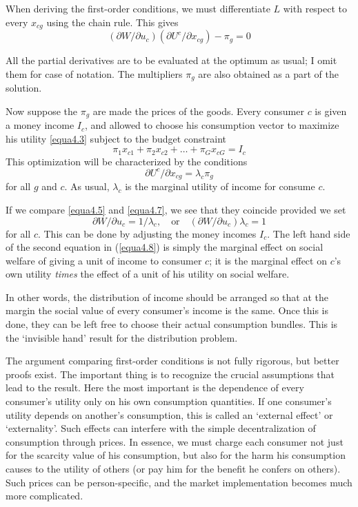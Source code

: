 When deriving the first-order conditions, we must differentiate $L$ with respect to every $x_{cg}$ using the chain rule. This gives
\begin{equation} \label{equa4.5}
 (\partial W / \partial u_c)  (\partial U^c / \partial x_{cg}) - \pi_g =0
\end{equation}

All the partial derivatives are to be evaluated at the optimum as usual; I omit them for case of notation. The multipliers $\pi_g$ are also obtained as a part of the solution.

Now suppose the $\pi_g$ are made the prices of the goods. Every consumer $c$ is given a money income $I_c$, and allowed to choose his consumption vector to maximize his utility \ref{equa4.3} subject to the budget constraint
\begin{equation} \label{equa4.6}
  \pi_1 x_{c1} + \pi_2 x_{c2} + \dots + \pi_G x_{cG} = I_c
\end{equation}
This optimization will be characterized by the conditions
\begin{equation} \label{equa4.7}
   \partial U^c / \partial x_{cg} = \lambda_c \pi_g
\end{equation}
for all $g$ and $c$. As usual, $\lambda_c$ is the marginal utility of income for consume $c$.

If we compare \ref{equa4.5} and \ref{equa4.7}, we see that they coincide provided we set
\begin{equation} \label{equa4.8}
 \partial W/ \partial u_c = 1/\lambda_c, \quad \mbox{or} \quad (\partial W/ \partial u_c ) \lambda_c =1
\end{equation}
for all $c$. This can be done by adjusting the money incomes $I_c$. The left hand side of the second equation in (\ref{equa4.8}) is simply the marginal effect on social welfare of giving a unit of income to consumer $c$; it is the marginal effect on $c$'s own utility \textit{times} the effect of a unit of his utility on social welfare.

In other words, the distribution of income should be arranged so that at the margin the social value of every consumer's income is the same. Once this is done, they can be left free to choose their actual consumption bundles. This is the `invisible hand' result for the distribution problem.

The argument comparing first-order conditions is not fully rigorous, but better proofs exist. The important thing is to recognize the crucial assumptions that lead to the result. Here the most important is the dependence of every consumer's utility only on his own consumption quantities. If one consumer's utility depends on another's consumption, this is called an `external effect' or `externality'. Such effects can interfere with the simple decentralization of consumption through prices. In essence, we must charge each consumer not just for the scarcity value of his consumption, but also for the harm his consumption causes to the utility of others (or pay him for the benefit he confers on others). Such prices can be person-specific, and the market implementation becomes much more complicated.


